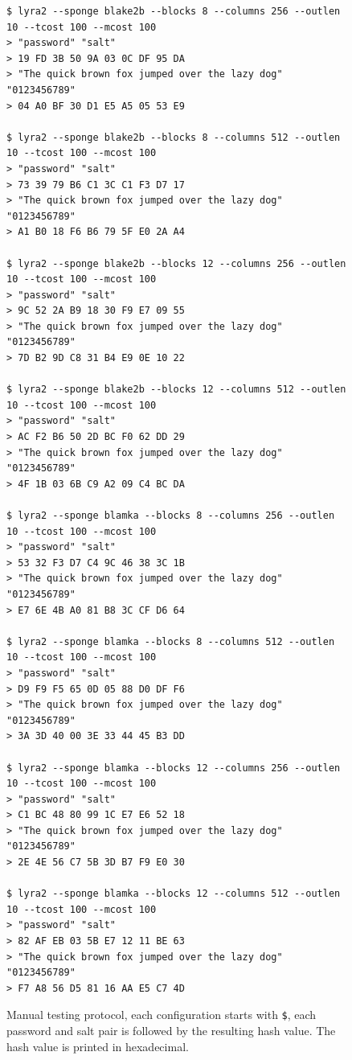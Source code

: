 \begin{figure}[p]
\begin{verbatim}
$ lyra2 --sponge blake2b --blocks 8 --columns 256 --outlen 10 --tcost 100 --mcost 100
> "password" "salt"
> 19 FD 3B 50 9A 03 0C DF 95 DA
> "The quick brown fox jumped over the lazy dog" "0123456789"
> 04 A0 BF 30 D1 E5 A5 05 53 E9

$ lyra2 --sponge blake2b --blocks 8 --columns 512 --outlen 10 --tcost 100 --mcost 100
> "password" "salt"
> 73 39 79 B6 C1 3C C1 F3 D7 17
> "The quick brown fox jumped over the lazy dog" "0123456789"
> A1 B0 18 F6 B6 79 5F E0 2A A4

$ lyra2 --sponge blake2b --blocks 12 --columns 256 --outlen 10 --tcost 100 --mcost 100
> "password" "salt"
> 9C 52 2A B9 18 30 F9 E7 09 55
> "The quick brown fox jumped over the lazy dog" "0123456789"
> 7D B2 9D C8 31 B4 E9 0E 10 22

$ lyra2 --sponge blake2b --blocks 12 --columns 512 --outlen 10 --tcost 100 --mcost 100
> "password" "salt"
> AC F2 B6 50 2D BC F0 62 DD 29
> "The quick brown fox jumped over the lazy dog" "0123456789"
> 4F 1B 03 6B C9 A2 09 C4 BC DA

$ lyra2 --sponge blamka --blocks 8 --columns 256 --outlen 10 --tcost 100 --mcost 100
> "password" "salt"
> 53 32 F3 D7 C4 9C 46 38 3C 1B
> "The quick brown fox jumped over the lazy dog" "0123456789"
> E7 6E 4B A0 81 B8 3C CF D6 64

$ lyra2 --sponge blamka --blocks 8 --columns 512 --outlen 10 --tcost 100 --mcost 100
> "password" "salt"
> D9 F9 F5 65 0D 05 88 D0 DF F6
> "The quick brown fox jumped over the lazy dog" "0123456789"
> 3A 3D 40 00 3E 33 44 45 B3 DD

$ lyra2 --sponge blamka --blocks 12 --columns 256 --outlen 10 --tcost 100 --mcost 100
> "password" "salt"
> C1 BC 48 80 99 1C E7 E6 52 18
> "The quick brown fox jumped over the lazy dog" "0123456789"
> 2E 4E 56 C7 5B 3D B7 F9 E0 30

$ lyra2 --sponge blamka --blocks 12 --columns 512 --outlen 10 --tcost 100 --mcost 100
> "password" "salt"
> 82 AF EB 03 5B E7 12 11 BE 63
> "The quick brown fox jumped over the lazy dog" "0123456789"
> F7 A8 56 D5 81 16 AA E5 C7 4D
\end{verbatim}
\caption{Manual testing protocol, each configuration starts with \texttt{\$}, each password and salt pair is followed by the resulting hash value. The hash value is printed in hexadecimal.}
\label{fig:manual-testing}
\end{figure}

